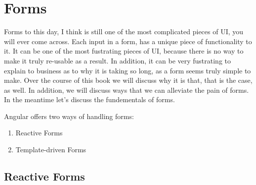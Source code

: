 \maketitle{}
\section{ Forms }

Forms to this day, I think is still one of the most complicated pieces of UI,
you will ever come across. Each input in a form, has a unique piece of 
functionality to it. It can be one of the most fustrating pieces of UI, 
because there is no way to make it truly re-usable as a result. In 
addition, it can be very fustrating to explain to business as to why it is 
taking so long, as a form seems truly simple to make. Over the course of this 
book we will discuss why it is that, that is the case, as well. In addition,
we will discuss ways that we can alleviate the pain of forms. In the meantime 
let's discuss the fundementals of forms. 

Angular offers two ways of handling forms: 
\begin{enumerate}
  \item Reactive Forms 
  \item Template-driven Forms
\end{enumerate}

\subsection{ Reactive Forms }
